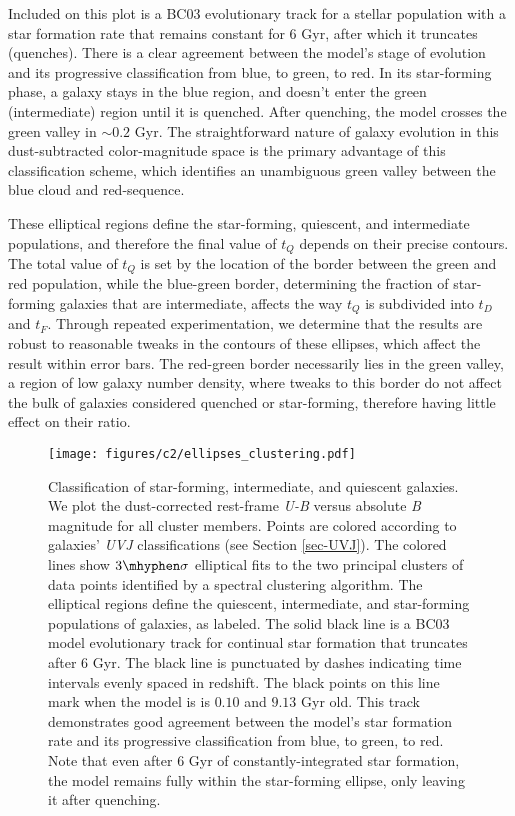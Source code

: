 Included on this plot is a BC03 evolutionary track for a stellar population with a star formation rate that remains constant for 6 Gyr, after which it truncates (quenches).
There is a clear agreement between the model's stage of evolution and its progressive classification from blue, to green, to red.
In its star-forming phase, a galaxy stays in the blue region, and doesn't enter the green (intermediate) region until it is quenched.
After quenching, the model crosses the green valley in $\sim0.2$ Gyr.
The straightforward nature of galaxy evolution in this dust-subtracted color-magnitude space is the primary advantage of this classification scheme, which identifies an unambiguous green valley between the blue cloud and red-sequence.

These elliptical regions define the star-forming, quiescent, and intermediate populations, and therefore the final value of $t_Q$ depends on their precise contours.
The total value of $t_Q$ is set by the location of the border between the green and red population, while the blue-green border, determining the fraction of star-forming galaxies that are intermediate, affects the way $t_Q$ is subdivided into $t_D$ and $t_F$.
Through repeated experimentation, we determine that the results are robust to reasonable tweaks in the contours of these ellipses, which affect the result within error bars.
The red-green border necessarily lies in the green valley, a region of low galaxy number density, where tweaks to this border do not affect the bulk of galaxies considered quenched or star-forming, therefore having little effect on their ratio.

\begin{figure}[h!]
\centering \texttt{[image: figures/c2/ellipses\_clustering.pdf]}
\caption[Criteria for classifying star-forming, intermediate, and quiescent galaxies based on cuts in dust-corrected color-magnitude space]{Classification of star-forming, intermediate, and quiescent galaxies.
We plot the dust-corrected rest-frame \textit{U-B} versus absolute \textit{B} magnitude for all cluster members.
Points are colored according to galaxies' \textit{UVJ} classifications (see Section \ref{sec-UVJ}).
The colored lines show $3\mhyphen\sigma$ elliptical fits to the two principal clusters of data points identified by a spectral clustering algorithm.
The elliptical regions define the quiescent, intermediate, and star-forming populations of galaxies, as labeled.
The solid black line is a BC03 model evolutionary track for continual star formation that truncates after 6 Gyr.
The black line is punctuated by dashes indicating time intervals evenly spaced in redshift.
The black points on this line mark when the model is is $0.10$ and $9.13$ Gyr old.
This track demonstrates good agreement between the model's star formation rate and its progressive classification from blue, to green, to red.
Note that even after 6 Gyr of constantly-integrated star formation, the model remains fully within the star-forming ellipse, only leaving it after quenching.
\label{fig-ellipses}}
\end{figure}

